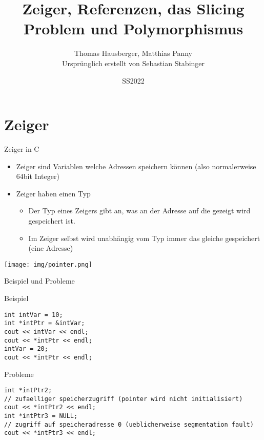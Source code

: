 \documentclass[presentation]{beamer}
\author{Thomas Hausberger, Matthias Panny \\ Ursprünglich erstellt von Sebastian Stabinger}
\date{SS2022}
\title{Zeiger, Referenzen, das Slicing Problem und Polymorphismus}
\begin{document}
\maketitle

\section{Zeiger}
\label{sec:orgd1fe54c}
\begin{frame}[label={sec:orgfdfe725}]{Zeiger in C}
\begin{itemize}
\item Zeiger sind Variablen welche Adressen speichern können (also
normalerweise 64bit Integer)
\item Zeiger haben einen Typ
\begin{itemize}
\item Der Typ eines Zeigers gibt an, was an der Adresse auf die gezeigt
wird gespeichert ist.
\item Im Zeiger selbst wird unabhängig vom Typ immer das gleiche
gespeichert (eine Adresse)
\end{itemize}
\end{itemize}
\begin{center}
\texttt{[image: img/pointer.png]}
\end{center}
\end{frame}
\begin{frame}[label={sec:orgf82d720},fragile]{Beispiel und Probleme}
 \begin{block}{Beispiel}
\begin{verbatim}
int intVar = 10;
int *intPtr = &intVar;
cout << intVar << endl;
cout << *intPtr << endl;
intVar = 20;
cout << *intPtr << endl;
\end{verbatim}
\end{block}
\begin{block}{Probleme}
\begin{verbatim}
int *intPtr2;
// zufaelliger speicherzugriff (pointer wird nicht initialisiert)
cout << *intPtr2 << endl;
int *intPtr3 = NULL;
// zugriff auf speicheradresse 0 (ueblicherweise segmentation fault)
cout << *intPtr3 << endl;
\end{verbatim}
\end{block}
\end{frame}
\end{document}
